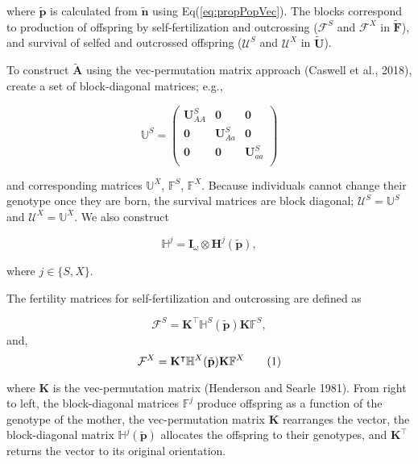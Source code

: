\documentclass[11pt]{article}
\newcommand\numberthis{\addtocounter{equation}{1}\tag{\theequation}}
\def\mbf#1{\mathbf{#1}}
\def\mbb#1{\mathbb{#1}}
\def\mcal#1{\mathcal{#1}}
\begin{document}
\noindent where $\tilde{\mbf{p}}$ is calculated from $\tilde{\mbf{n}}$ using Eq(\ref{eq:propPopVec}). The blocks correspond to production of offspring by self-fertilization and outcrossing ($\mcal{F}^S$ and $\mcal{F}^X$ in $\tilde{\mbf{F}}$), and survival of selfed and outcrossed offspring ($\mcal{U}^S$ and $\mcal{U}^X$ in $\tilde{\mbf{U}}$). 


To construct $\tilde{\mbf{A}}$ using the vec-permutation matrix approach (Caswell et al., 2018), create a set of block-diagonal matrices; e.g.,

\begin{equation}
	\mbb{U}^S = 
		\left(
			\begin{array}{ccc}
				\mbf{U}^{S}_{AA} & \mbf{0} & \mbf{0} \\
				\mbf{0} & \mbf{U}^{S}_{Aa} & \mbf{0} \\
				\mbf{0} & \mbf{0} & \mbf{U}^{S}_{aa} \\
			\end{array} \right)
\end{equation}

\noindent and corresponding matrices $\mbb{U}^X$, $\mbb{F}^S$, $\mbb{F}^X$. Because individuals cannot change their genotype once they are born, the survival matrices are block diagonal; $\mcal{U}^S = \mbb{U}^S$ and $\mcal{U}^X = \mbb{U}^X$. We also construct

\begin{equation}
	\mbb{H}^j = \mbf{I}_{\omega} \otimes \mbf{H}^j(\tilde{\mbf{p}}),
\end{equation}

\noindent where $j \in \{S,X\}$.

The fertility matrices for self-fertilization and outcrossing are defined as

\begin{equation} \label{eq:FS}
	\mcal{F}^S = \mbf{K}^{\intercal} \mbb{H}^S(\tilde{\mbf{p}}) \mbf{K} \mbb{F}^S, 
\end{equation}
\noindent and, 
\begin{equation} \label{eq:FX}
	\mcal{F}^X = \mbf{K}^{\intercal} \mbb{H}^X(\tilde{\mbf{p}}) \mbf{K} \mbb{F}^X \numberthis
\end{equation}

\noindent where $\mbf{K}$ is the vec-permutation matrix (Henderson and Searle 1981). From right to left, the block-diagonal matrices $\mbb{F}^j$ produce offspring as a function of the genotype of the mother, the vec-permutation matrix $\mbf{K}$ rearranges the vector, the block-diagonal
matrix $\mbb{H}^j(\tilde{\mbf{p}})$ allocates the offspring to their genotypes, and $\mbf{K}^{\intercal}$ returns the vector to its original orientation.
\end{document}
